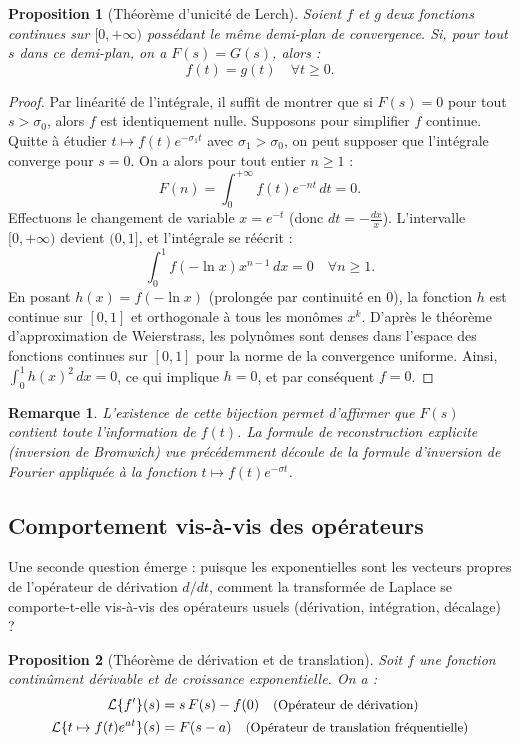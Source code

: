 \documentclass[11pt, a4paper]{article}
\theoremstyle{plain_style}
\newtheorem{proposition}{Proposition}
\newtheorem{remarque}{Remarque}
\begin{document}
\begin{proposition}[Théorème d'unicité de Lerch]
Soient $f$ et $g$ deux fonctions continues sur $[0, +\infty)$ possédant le même demi-plan de convergence. Si, pour tout $s$ dans ce demi-plan, on a $F(s) = G(s)$, alors :
\[
  f(t) = g(t) \quad \forall t \ge 0.
\]
\end{proposition}

\begin{proof}
Par linéarité de l'intégrale, il suffit de montrer que si $F(s) = 0$ pour tout $s > \sigma_0$, alors $f$ est identiquement nulle. Supposons pour simplifier $f$ continue. Quitte à étudier $t \mapsto f(t)e^{-\sigma_1 t}$ avec $\sigma_1 > \sigma_0$, on peut supposer que l'intégrale converge pour $s=0$. On a alors pour tout entier $n \ge 1$ :
\[
  F(n) = \int_0^{+\infty} f(t)e^{-nt}\,dt = 0.
\]
Effectuons le changement de variable $x = e^{-t}$ (donc $dt = -\frac{dx}{x}$). L'intervalle $[0, +\infty)$ devient $(0, 1]$, et l'intégrale se réécrit :
\[
  \int_0^1 f(-\ln x) x^{n-1}\,dx = 0 \quad \forall n \ge 1.
\]
En posant $h(x) = f(-\ln x)$ (prolongée par continuité en $0$), la fonction $h$ est continue sur $[0,1]$ et orthogonale à tous les monômes $x^k$. D'après le théorème d'approximation de Weierstrass, les polynômes sont denses dans l'espace des fonctions continues sur $[0,1]$ pour la norme de la convergence uniforme. Ainsi, $\int_0^1 h(x)^2\,dx = 0$, ce qui implique $h = 0$, et par conséquent $f = 0$.
\end{proof}

\begin{remarque}
L'existence de cette bijection permet d'affirmer que $F(s)$ contient toute l'information de $f(t)$. La formule de reconstruction explicite (inversion de Bromwich) vue précédemment découle de la formule d'inversion de Fourier appliquée à la fonction $t \mapsto f(t)e^{-\sigma t}$.
\end{remarque}

\subsection{Comportement vis-à-vis des opérateurs}

Une seconde question émerge : puisque les exponentielles sont les vecteurs propres de l'opérateur de dérivation $d/dt$, comment la transformée de Laplace se comporte-t-elle vis-à-vis des opérateurs usuels (dérivation, intégration, décalage) ?

\begin{proposition}[Théorème de dérivation et de translation]
Soit $f$ une fonction continûment dérivable et de croissance exponentielle. On a :
\begin{align*}
  \mathcal{L}\{f'\}(s) &= s\,F(s) - f(0) \quad \text{\small (Opérateur de dérivation)} \\
  \mathcal{L}\{t \mapsto f(t)e^{at}\}(s) &= F(s-a) \quad \text{\small (Opérateur de translation fréquentielle)}
\end{align*}
\end{proposition}
\end{document}
